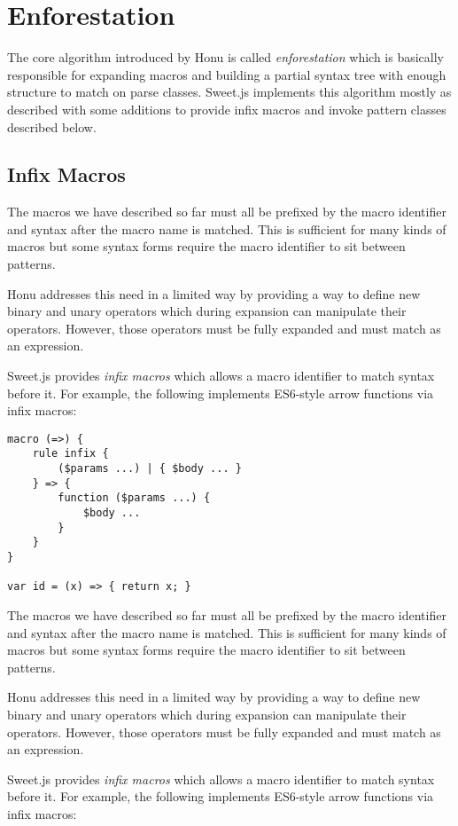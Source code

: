 \documentclass[preprint,10pt]{sigplanconf}
\begin{document}
\section{Enforestation}
\label{sec-4}

The core algorithm introduced by Honu is called \emph{enforestation} which
is basically responsible for expanding macros and building a partial
syntax tree with enough structure to match on parse classes. Sweet.js
implements this algorithm mostly as described with some additions to
provide infix macros and invoke pattern classes described below.

\subsection{Infix Macros}
\label{sec-4-1}
The macros we have described so far must all be prefixed by the macro
identifier and syntax after the macro name is matched. This is
sufficient for many kinds of macros but some syntax forms require the
macro identifier to sit between patterns.

Honu addresses this need in a limited way by providing a way to define
new binary and unary operators which during expansion can manipulate
their operators. However, those operators must be fully expanded and
must match as an expression.

Sweet.js provides \emph{infix macros} which allows a macro identifier to
match syntax before it. For example, the following implements
ES6-style arrow functions via infix macros:

\begin{verbatim}
macro (=>) {
    rule infix {
        ($params ...) | { $body ... }
    } => {
        function ($params ...) {
            $body ...
        }
    }
}

var id = (x) => { return x; }
\end{verbatim}

The macros we have described so far must all be prefixed by the macro
identifier and syntax after the macro name is matched. This is
sufficient for many kinds of macros but some syntax forms require the
macro identifier to sit between patterns.

Honu addresses this need in a limited way by providing a way to define
new binary and unary operators which during expansion can manipulate
their operators. However, those operators must be fully expanded and
must match as an expression.

Sweet.js provides \emph{infix macros} which allows a macro identifier to
match syntax before it. For example, the following implements
ES6-style arrow functions via infix macros:
\end{document}

